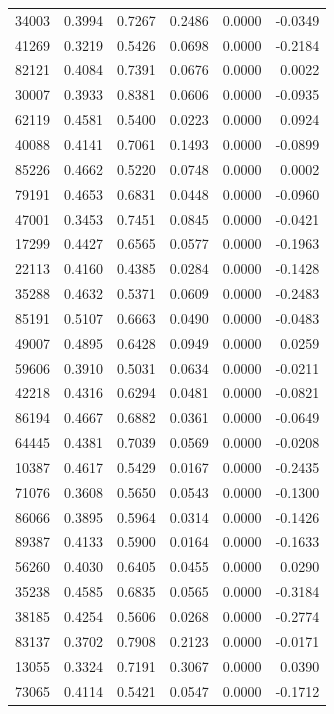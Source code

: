 \begin{tabular}{lrrrrr}
34003 & 0.3994 & 0.7267 & 0.2486 & 0.0000 & -0.0349 \\
41269 & 0.3219 & 0.5426 & 0.0698 & 0.0000 & -0.2184 \\
82121 & 0.4084 & 0.7391 & 0.0676 & 0.0000 & 0.0022 \\
30007 & 0.3933 & 0.8381 & 0.0606 & 0.0000 & -0.0935 \\
62119 & 0.4581 & 0.5400 & 0.0223 & 0.0000 & 0.0924 \\
40088 & 0.4141 & 0.7061 & 0.1493 & 0.0000 & -0.0899 \\
85226 & 0.4662 & 0.5220 & 0.0748 & 0.0000 & 0.0002 \\
79191 & 0.4653 & 0.6831 & 0.0448 & 0.0000 & -0.0960 \\
47001 & 0.3453 & 0.7451 & 0.0845 & 0.0000 & -0.0421 \\
17299 & 0.4427 & 0.6565 & 0.0577 & 0.0000 & -0.1963 \\
22113 & 0.4160 & 0.4385 & 0.0284 & 0.0000 & -0.1428 \\
35288 & 0.4632 & 0.5371 & 0.0609 & 0.0000 & -0.2483 \\
85191 & 0.5107 & 0.6663 & 0.0490 & 0.0000 & -0.0483 \\
49007 & 0.4895 & 0.6428 & 0.0949 & 0.0000 & 0.0259 \\
59606 & 0.3910 & 0.5031 & 0.0634 & 0.0000 & -0.0211 \\
42218 & 0.4316 & 0.6294 & 0.0481 & 0.0000 & -0.0821 \\
86194 & 0.4667 & 0.6882 & 0.0361 & 0.0000 & -0.0649 \\
64445 & 0.4381 & 0.7039 & 0.0569 & 0.0000 & -0.0208 \\
10387 & 0.4617 & 0.5429 & 0.0167 & 0.0000 & -0.2435 \\
71076 & 0.3608 & 0.5650 & 0.0543 & 0.0000 & -0.1300 \\
86066 & 0.3895 & 0.5964 & 0.0314 & 0.0000 & -0.1426 \\
89387 & 0.4133 & 0.5900 & 0.0164 & 0.0000 & -0.1633 \\
56260 & 0.4030 & 0.6405 & 0.0455 & 0.0000 & 0.0290 \\
35238 & 0.4585 & 0.6835 & 0.0565 & 0.0000 & -0.3184 \\
38185 & 0.4254 & 0.5606 & 0.0268 & 0.0000 & -0.2774 \\
83137 & 0.3702 & 0.7908 & 0.2123 & 0.0000 & -0.0171 \\
13055 & 0.3324 & 0.7191 & 0.3067 & 0.0000 & 0.0390 \\
73065 & 0.4114 & 0.5421 & 0.0547 & 0.0000 & -0.1712 \\

\end{tabular}
